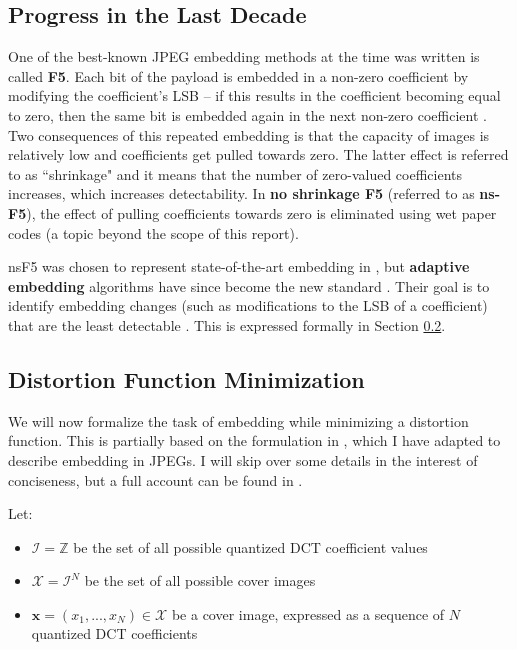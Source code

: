 \documentclass[11pt,a4paper,twoside,openright]{report}
\begin{document}
\subsection{Progress in the Last Decade} \label{sec:embed-progress}

One of the best-known JPEG embedding methods at the time \cite{2008-paper} was written is called \textbf{F5}. Each bit of the payload is embedded in a non-zero coefficient by modifying the coefficient's LSB -- if this results in the coefficient becoming equal to zero, then the same bit is embedded again in the next non-zero coefficient \cite{f5}. Two consequences of this repeated embedding is that the capacity of images is relatively low and coefficients get pulled towards zero. The latter effect is referred to as ``shrinkage" and it means that the number of zero-valued coefficients increases, which increases detectability. In \textbf{no shrinkage F5} (referred to as \textbf{ns-F5}), the effect of pulling coefficients towards zero is eliminated using wet paper codes \cite{no-shrinkage-f5} (a topic beyond the scope of this report).

nsF5 was chosen to represent state-of-the-art embedding in \cite{2008-paper}, but \textbf{adaptive embedding} algorithms have since become the new standard \cite{costs-and-capacity}. Their goal is to identify embedding changes (such as modifications to the LSB of a coefficient) that are the least detectable \cite{ker-notes}. This is expressed formally in Section \ref{sec:distortion-function-min}.


\subsection{Distortion Function Minimization} \label{sec:distortion-function-min}

We will now formalize the task of embedding while minimizing a distortion function. This is partially based on the formulation in \cite{stc-paper}, which I have adapted to describe embedding in JPEGs. I will skip over some details in the interest of conciseness, but a full account can be found in \cite{stc-paper}.

Let:
\begin{itemize}
	\item $\mathcal{I} = \mathbb{Z}$ be the set of all possible quantized DCT coefficient values
	\item $\mathcal{X} = \mathcal{I}^N$ be the set of all possible cover images
	\item $\bm{x} = (x_1,...,x_N) \in \mathcal{X}$ be a cover image, expressed as a sequence of $N$ quantized DCT coefficients
\end{itemize}
\end{document}
